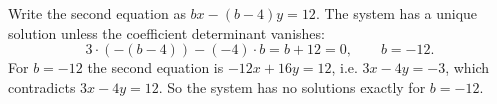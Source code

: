 Write the second equation as $bx-(b-4)y=12$. The system has a unique solution unless the coefficient determinant vanishes:
\[3\cdot\left(-(b-4)\right)-(-4)\cdot b=b+12=0,\qquad b=-12.\]
For $b=-12$ the second equation is $-12x+16y=12$, i.e. $3x-4y=-3$, which contradicts $3x-4y=12$. So the system has no solutions exactly for $b=\boxed{-12}$.
